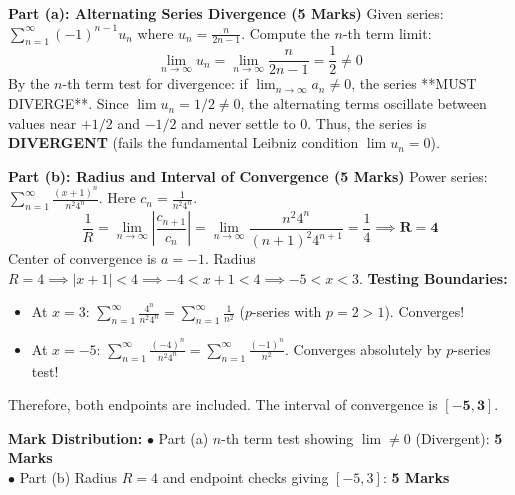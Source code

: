 \begin{solutionbox}
\textbf{Part (a): Alternating Series Divergence (5 Marks)}
Given series: $\sum_{n=1}^\infty (-1)^{n-1} u_n$ where $u_n = \frac{n}{2n - 1}$.
Compute the $n$-th term limit:
\[
\lim_{n\to\infty} u_n = \lim_{n\to\infty} \frac{n}{2n - 1} = \frac{1}{2} \neq 0
\]
By the $n$-th term test for divergence: if $\lim_{n\to\infty} a_n \neq 0$, the series **MUST DIVERGE**.
Since $\lim u_n = 1/2 \neq 0$, the alternating terms oscillate between values near $+1/2$ and $-1/2$ and never settle to 0.
Thus, the series is \textbf{DIVERGENT} (fails the fundamental Leibniz condition $\lim u_n = 0$).

\textbf{Part (b): Radius and Interval of Convergence (5 Marks)}
Power series: $\sum_{n=1}^\infty \frac{(x+1)^n}{n^2 4^n}$. Here $c_n = \frac{1}{n^2 4^n}$.
\[
\frac{1}{R} = \lim_{n\to\infty} \left|\frac{c_{n+1}}{c_n}\right| = \lim_{n\to\infty} \frac{n^2 4^n}{(n+1)^2 4^{n+1}} = \frac{1}{4} \implies \mathbf{R = 4}
\]
Center of convergence is $a = -1$.
Radius $R = 4 \implies |x + 1| < 4 \implies -4 < x + 1 < 4 \implies -5 < x < 3$.
\textbf{Testing Boundaries:}
\begin{itemize}[leftmargin=6mm]
    \item At $x = 3$: $\sum_{n=1}^\infty \frac{4^n}{n^2 4^n} = \sum_{n=1}^\infty \frac{1}{n^2}$ ($p$-series with $p=2 > 1$). Converges!
    \item At $x = -5$: $\sum_{n=1}^\infty \frac{(-4)^n}{n^2 4^n} = \sum_{n=1}^\infty \frac{(-1)^n}{n^2}$. Converges absolutely by $p$-series test!
\end{itemize}
Therefore, both endpoints are included. The interval of convergence is $\mathbf{[-5, 3]}$.

\begin{markingrubric}
\textbf{Mark Distribution:}
$\bullet$ Part (a) $n$-th term test showing $\lim \neq 0$ (Divergent): \textbf{5 Marks}\\
$\bullet$ Part (b) Radius $R = 4$ and endpoint checks giving $[-5, 3]$: \textbf{5 Marks}
\end{markingrubric}
\end{solutionbox}


